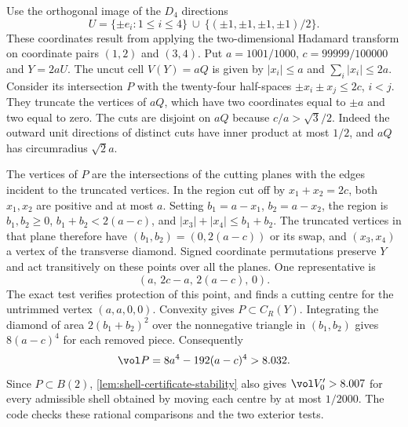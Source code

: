 \begin{example}
\label{ex:exact-shell-computed}
Use the orthogonal image of the \(D_4\) directions
\[
 U=\{\pm e_i:1\le i\le4\}
   \ \cup\ \{(\pm1,\pm1,\pm1,\pm1)/2\}.
\]
These coordinates result from applying the two-dimensional Hadamard
transform on coordinate pairs \((1,2)\) and \((3,4)\). Put
\(a=1001/1000\), \(c=99999/100000\) and \(Y=2aU\).
The uncut cell \(V(Y)=aQ\) is given by \(|x_i|\le a\) and
\(\sum_i|x_i|\le2a\). Consider its intersection \(P\) with the
twenty-four half-spaces \(\pm x_i\pm x_j\le2c\), \(i<j\).
They truncate the vertices of \(aQ\), which have two coordinates
equal to \(\pm a\) and two equal to zero. The cuts are disjoint on
\(aQ\) because \(c/a>\sqrt3/2\). Indeed the outward unit directions
of distinct cuts have inner product at most \(1/2\), and \(aQ\) has
circumradius \(\sqrt2a\).

The vertices of \(P\) are the intersections of the cutting planes
with the edges incident to the truncated vertices. In the region
cut off by \(x_1+x_2=2c\), both \(x_1,x_2\) are positive and
at most \(a\). Setting \(b_1=a-x_1\), \(b_2=a-x_2\), the region is
\(b_1,b_2\ge0\), \(b_1+b_2<2(a-c)\), and
\(|x_3|+|x_4|\le b_1+b_2\). The truncated vertices in that plane
therefore have \((b_1,b_2)=(0,2(a-c))\) or its swap, and
\((x_3,x_4)\) a vertex of the transverse diamond. Signed coordinate
permutations preserve \(Y\) and act transitively on these points
over all the planes. One representative is
\[
 (a,\,2c-a,\,2(a-c),\,0).
\]
The exact test verifies protection of this point, and finds a cutting
centre for the untrimmed vertex \((a,a,0,0)\). Convexity gives
\(P\subset C_R(Y)\). Integrating the diamond of area \(2(b_1+b_2)^2\)
over the nonnegative triangle in \((b_1,b_2)\) gives \(8(a-c)^4\)
for each removed piece. Consequently
\[
 \vol P = 8a^4-192(a-c)^4 > 8.032 .
\]
Since \(P\subset B(2)\), \cref{lem:shell-certificate-stability} also gives
\(\vol V_0'>8.007\) for every admissible shell obtained by moving each
centre by at most \(1/2000\). The code checks these rational comparisons
and the two exterior tests.
\end{example}

